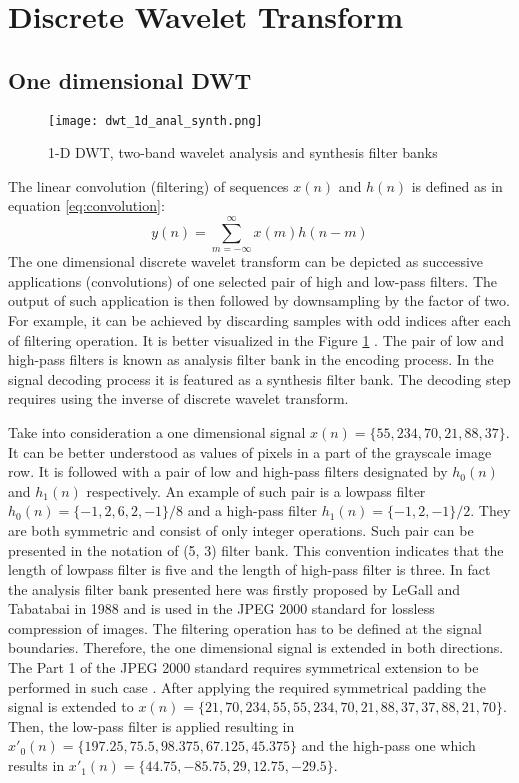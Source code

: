 \section{Discrete Wavelet Transform}

\subsection{One dimensional DWT}

\begin{figure}
    \centering
    \texttt{[image: dwt\_1d\_anal\_synth.png]}
    \caption{1-D DWT, two-band wavelet analysis and synthesis filter banks \cite{jpeg_suite}}
    \label{fig:dwt_1d_anal_synth}
\end{figure}

The linear convolution (filtering) of sequences $x(n)$ and $h(n)$ is defined as in equation \ref{eq:convolution}:
\begin{equation}
    y(n)=\sum_{m=-\infty}^{\infty}x(m)h(n-m)
\label{eq:convolution}
\end{equation}
The one dimensional discrete wavelet transform can be depicted as successive applications (convolutions) of
one selected pair of high and low-pass filters. The output of such application is then followed
by downsampling by the factor of two. For example, it can be achieved by discarding samples with
odd indices after each of filtering operation. It is better visualized in the Figure \ref{fig:dwt_1d_anal_synth} \cite{jpeg_suite}.
The pair of low and high-pass filters is known as analysis filter bank in the encoding process.
In the signal decoding process it is featured as a synthesis filter bank. The decoding step requires
using the inverse of discrete wavelet transform. 

Take into consideration a one dimensional signal $x(n) = \{55, 234, 70, 21, 88, 37\}$. It can be better
understood as values of pixels in a part of the grayscale image row. It is followed with a pair of low
and high-pass filters designated by $h_{0}(n)$ and $h_{1}(n)$ respectively. An example of such pair is
a lowpass filter $h_{0}(n) = \{-1, 2, 6, 2, -1\}/8$ and a high-pass filter $h_{1}(n) = \{-1, 2, -1\}/2$. They are both
symmetric and consist of only integer operations. Such pair can be presented in the notation of (5, 3) filter bank.
This convention indicates that the length of lowpass filter is five and the length of high-pass filter is three.
In fact the analysis filter bank presented here was firstly proposed by LeGall and Tabatabai in 1988 and
is used in the JPEG 2000 standard for lossless compression of images. The filtering operation has to
be defined at the signal boundaries. Therefore, the one dimensional signal is extended in both directions.
The Part 1 of the JPEG 2000 standard requires symmetrical extension to be performed in such case \cite{jpeg_suite}.
After applying the required symmetrical padding the signal is extended to
$x(n) = \{21, 70, 234, 55, 55, 234, 70, 21, 88, 37, 37, 88, 21, 70\}$. Then, the low-pass filter is applied
resulting in $x'_{0}(n) = \{197.25, 75.5, 98.375, 67.125, 45.375\}$ and the high-pass one which results in
$x'_{1}(n) = \{44.75, -85.75, 29, 12.75, -29.5\}$.

